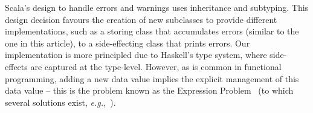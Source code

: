\documentclass[sigplan,screen]{acmart}
\newcommand{\RED}[1]{\textcolor{red}{#1}}
\newcommand{\TODO}[1]{\RED{[#1]}}
\newcommand{\ELIAS}[1]{\textcolor{orange}{[Elias: #1]}}
\newcommand{\KIKO}[1]{\textcolor{green}{[KIKO: #1]}}
\begin{document}
Scala's design to handle errors and warnings
uses inheritance and subtyping.
This design decision favours the creation of new subclasses to provide
different implementations, such as a storing class that
accumulates errors (similar to the one in this article), to a side-effecting class that prints errors.
Our implementation is more principled due to Haskell's type system, where
side-effects are captured at the type-level. However, as is common in functional programming,
adding a new data value implies the explicit management of this data value -- this is the problem known as the Expression Problem~\cite{exprProblem1,exprProblem2,exprProblem3} (to which several solutions exist, \emph{e.g.,}~\cite{ernst2004expression,Extensibility,DataTypesCarte,ExpressionRevisited}).
%
%


\end{document}
